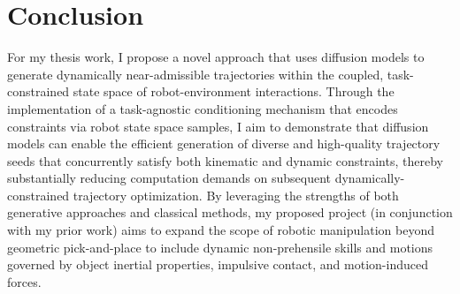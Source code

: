 \section{Conclusion}

For my thesis work, I propose a novel approach that uses diffusion models to generate dynamically near-admissible trajectories within the coupled, task-constrained state space of robot-environment interactions.
Through the implementation of a task-agnostic conditioning mechanism that encodes constraints via robot state space samples, I aim to demonstrate that diffusion models can enable the efficient generation of diverse and high-quality trajectory seeds that concurrently satisfy both kinematic and dynamic constraints, thereby substantially reducing computation demands on subsequent dynamically-constrained trajectory optimization.
By leveraging the strengths of both generative approaches and classical methods, my proposed project (in conjunction with my prior work) aims to expand the scope of robotic manipulation beyond geometric pick-and-place to include dynamic non-prehensile skills and motions governed by object inertial properties, impulsive contact, and motion-induced forces.

